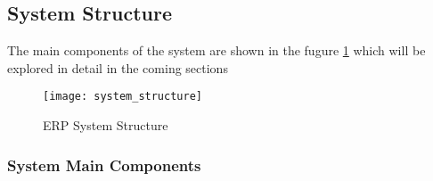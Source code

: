 \subsection{System Structure}

The main components of the system are shown in the fugure \ref{fig:system_structure} which will be explored in
detail in the coming sections

\begin{figure}
    \texttt{[image: system\_structure]}
    \centering
    \caption{ERP System Structure}
    \label{fig:system_structure}
\end{figure}


\subsubsection{System Main Components}

